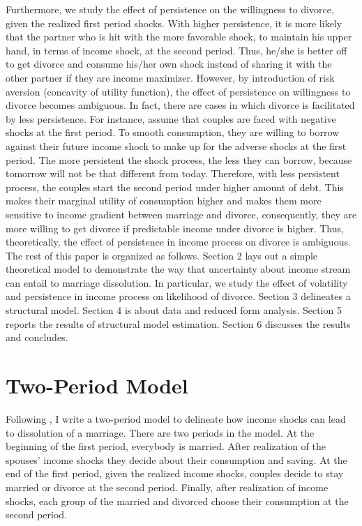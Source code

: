 Furthermore, we study the effect of persistence on the willingness to divorce, given the realized first period shocks. With higher persistence, it is more likely that the partner who is hit with the more favorable shock, to maintain his upper hand, in terms of income shock, at the second period. Thus, he/she is better off to get divorce and consume his/her own shock instead of sharing it with the other partner if they are income maximizer. However, by introduction of risk aversion (concavity of utility function), the effect of persistence on willingness to divorce becomes ambiguous. In fact, there are cases in which divorce is facilitated by less persistence. For instance, assume that couples are faced with negative shocks at the first period. To smooth consumption, they are willing to borrow against their future income shock to make up for the adverse shocks at the first period. The more persistent the shock process, the less they can borrow, because tomorrow will not be that different from today.  Therefore, with less persistent process, the couples start the second period under higher amount of debt.  This makes their marginal utility of consumption higher and makes them more sensitive to income gradient between marriage and divorce, consequently, they are more willing to get divorce if predictable income under divorce is higher. Thus, theoretically, the effect of persistence in income process on divorce is ambiguous. \\

The rest of this paper is organized as follows. Section 2 lays out a simple theoretical model to demonstrate the way that uncertainty about income stream can entail to marriage dissolution. In particular, we study the effect of volatility and persistence in income process on likelihood of divorce. Section 3 delineates a structural model. Section 4 is about data and reduced form analysis. Section 5 reports the results of structural model estimation. Section 6 discusses the results and concludes. \\

\section{Two-Period Model} 

Following \citet{Hess_2004}, I write a two-period model to delineate how income shocks can lead to dissolution of a marriage. There are two periods in the model. At the beginning of the first period, everybody is married. After realization of the spouses' income shocks they decide about their consumption and saving. At the end of the first period, given the realized income shocks, couples decide to stay married or divorce at the second period. Finally, after realization of income shocks, each group of the married and divorced choose their consumption at the second period. 

